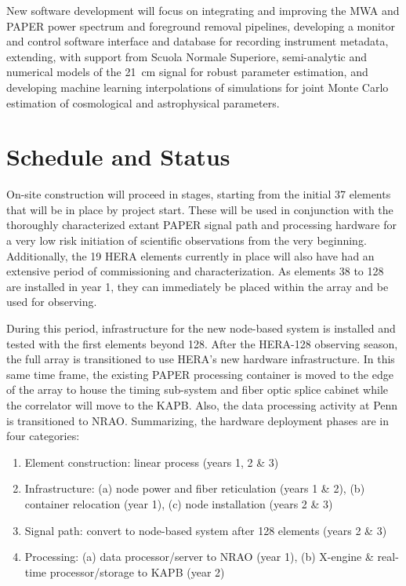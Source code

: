 \documentclass[preprint,11pt]{aastex}
\begin{document}
New software development will focus on integrating and improving the MWA and PAPER power spectrum and foreground removal pipelines,
developing a monitor and control software interface and database for recording instrument metadata,
extending, with support from Scuola Normale Superiore, semi-analytic and numerical models 
of the 21~cm signal for robust parameter estimation, and developing
machine learning interpolations of simulations for joint Monte Carlo estimation of cosmological and astrophysical parameters.


\section{Schedule and Status}
\label{sec:status}

\noindent On-site construction will proceed in stages, starting from the
initial 37 elements that will be in place by project start.  These will be used
in conjunction with the thoroughly characterized extant PAPER signal path and
processing hardware for a very low risk initiation of scientific observations
from the very beginning.  Additionally, the 19 HERA elements currently in
place will also have had an extensive period of commissioning
and characterization.  As elements 38 to 128 are installed in year 1, they can
immediately be placed within the array and be used for observing.

During this period, infrastructure for the new node-based system is installed
and tested with the first elements beyond 128.  After the HERA-128 observing
season, the full array is transitioned to use HERA's new hardware infrastructure.  In this same time frame, the existing PAPER processing
container is moved to the edge of the array to house the timing sub-system
and fiber optic splice cabinet while the correlator will move to the KAPB.
Also, the data processing activity at Penn is transitioned to NRAO.
Summarizing, the hardware deployment phases are in four categories:
\begin{enumerate}
\item Element construction:  linear process (years 1, 2 \& 3)
\item Infrastructure:  (a) node power and fiber reticulation (years 1 \& 2), (b) container relocation (year 1), (c) node installation (years 2 \& 3)
\item Signal path:  convert to node-based system after 128 elements (years 2 \& 3)
\item Processing:  (a) data processor/server to NRAO (year 1), (b) X-engine \& real-time processor/storage to KAPB (year 2)
\end{enumerate}
\end{document}

